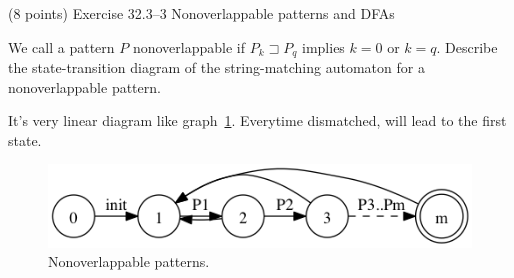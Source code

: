 \documentclass[paper=a4, fontsize=11pt]{scrartcl} %
\begin{document}
\begin{fancyquotes}
  (8 points) Exercise 32.3--3 Nonoverlappable patterns and DFAs

  We call a pattern $P$ nonoverlappable if $P_k \sqsupset P_q$ implies
  $k = 0$ or $k = q$. Describe the state-transition diagram of the
  string-matching automaton for a nonoverlappable pattern.
\end{fancyquotes}

It's very linear diagram like graph~\ref{fig:5}.
Everytime dismatched, will lead to the first state.

\begin{figure}[hp]
  \centering
  \includegraphics[width=.7\textwidth]{5.gv.png}
  \caption{Nonoverlappable patterns.}
\label{fig:5}
\end{figure}



\pagebreak
\end{document}
